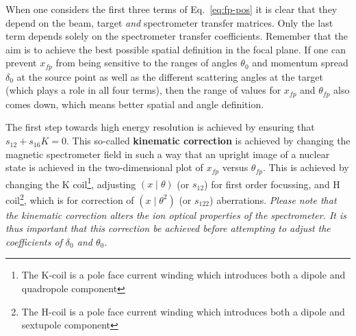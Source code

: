 \documentclass[11pt]{report}
\begin{document}
When one considers the first three terms of Eq.~\ref{eq:fp-pos} it is clear that they depend on the beam, target {\it and} spectrometer transfer matrices.
Only the last term depends solely on the spectrometer transfer coefficients. 
Remember that the aim is to achieve the best possible spatial definition in the focal plane.
If one can prevent $x_{fp}$ from being sensitive to the ranges of angles $\theta_0$ and momentum spread
$\delta_{0}$ at the source point as well
as the different scattering angles at the target (which plays a role in all four terms), 
then the range of values for $x_{fp}$ and $\theta_{fp}$ also comes down, which
means better spatial and angle definition.

The first step towards high energy resolution is achieved by ensuring that $s_{12}+s_{16}K=0$.
This so-called {\bf kinematic correction} is achieved by changing the magnetic spectrometer field in such a way that an upright image of a nuclear state is achieved in the two-dimensional plot of $x_{fp}$ versus $\theta_{fp}$. This is achieved by changing the K coil\footnote{The K-coil is a pole face current winding which introduces both a dipole and quadropole component}, adjusting $(x\mid\theta)$ (or $s_{12}$) for first order focussing, and H coil\footnote{The H-coil is a pole face current winding which introduces both a dipole and sextupole component}, which is for correction of $(x\mid\theta^2)$ (or $s_{122}$) aberrations. 
{\it Please note that the kinematic correction alters the ion optical properties of the spectrometer.
It is thus important that this correction be achieved before attempting to adjust the coefficients 
of $\delta_0$ and $\theta_0$.}
\end{document}
